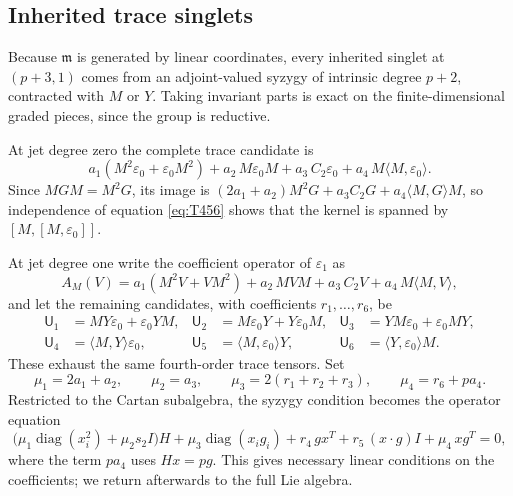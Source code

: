 \documentclass[10pt,reqno]{amsart}
\numberwithin{equation}{section}
\theoremstyle{plain}
\theoremstyle{definition}
\DeclareMathOperator{\diag}{diag}
\newcommand{\sU}{\mathsf{U}}
\newcommand{\ip}[2]{\langle #1, #2\rangle}
\begin{document}
\subsection{Inherited trace singlets}\label{sec:inherited}

Because $\mathfrak{m}$ is generated by linear coordinates, every inherited singlet at $(p+3,1)$ comes from an adjoint-valued syzygy of intrinsic degree $p+2$, contracted with $M$ or $Y$. Taking invariant parts is exact on the finite-dimensional graded pieces, since the group is reductive.

At jet degree zero the complete trace candidate is
\begin{equation*}
	a_1(M^2\varepsilon_0+\varepsilon_0M^2)+a_2\,M\varepsilon_0M+a_3\,C_2\varepsilon_0+a_4\,M\ip M{\varepsilon_0}.
\end{equation*}
Since $MGM=M^2G$, its image is $(2a_1+a_2)M^2G+a_3C_2G+a_4\ip MGM$, so independence of equation \eqref{eq:T456} shows that the kernel is spanned by $[M,[M,\varepsilon_0]]$.

At jet degree one write the coefficient operator of $\varepsilon_1$ as
\begin{equation*}
	A_M(V)=a_1(M^2V+VM^2)+a_2\,MVM+a_3\,C_2V+a_4\,M\ip MV ,
\end{equation*}
and let the remaining candidates, with coefficients $r_1,\dots,r_6$, be
\begin{equation*}
\begin{aligned}
	\sU_1&=MY\varepsilon_0+\varepsilon_0YM, & \sU_2&=M\varepsilon_0Y+Y\varepsilon_0M, & \sU_3&=YM\varepsilon_0+\varepsilon_0MY,\\
	\sU_4&=\ip MY\varepsilon_0, & \sU_5&=\ip M{\varepsilon_0}Y, & \sU_6&=\ip Y{\varepsilon_0}M .
\end{aligned}
\end{equation*}
These exhaust the same fourth-order trace tensors. Set
\begin{equation*}
	\mu_1=2a_1+a_2,\qquad \mu_2=a_3,\qquad \mu_3=2(r_1+r_2+r_3),\qquad \mu_4=r_6+pa_4 .
\end{equation*}
Restricted to the Cartan subalgebra, the syzygy condition becomes the operator equation
\begin{equation*}
	\big(\mu_1\diag(x_i^2)+\mu_2s_2I\big)H+\mu_3\diag(x_ig_i)+r_4\,gx^T+r_5\,(x\cdot g)I+\mu_4\,xg^T=0,
\end{equation*}
where the term $pa_4$ uses $Hx=pg$. This gives necessary linear conditions on the coefficients; we return afterwards to the full Lie algebra.
\end{document}
